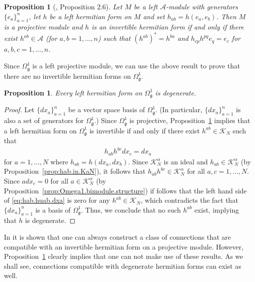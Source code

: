 \documentclass{amsart}
\newtheorem{proposition}[theorem]{Proposition}
\theoremstyle{definition}
\theoremstyle{remark}
\numberwithin{equation}{section}
\newcommand{\A}{\mathcal{A}}
\newcommand{\K}{\mathcal{K}}
\newcommand{\KN}{\K_N}
\newcommand{\KaN}{\K^\alpha_N}
\newcommand{\g}{\mathfrak{g}}
\newcommand{\Omegaoneg}{\Omega^1_{\g}}
\begin{document}
\begin{proposition}[\cite{a:levi-civita.class.nms}, Proposition 2.6]\label{prop:huab.equiv.projective}
  Let $M$ be a left $\A$-module with generators $\{e_a\}_{a=1}^n$, let
  $h$ be a left hermitian form on $M$ and set
  $h_{ab}=h(e_a,e_b)$. Then $M$ is a projective module and $h$ is an
  invertible hermitian form if and only if there exist $h^{ab}\in\A$
  (for $a,b=1,\ldots,n$) such that $(h^{ab})^\ast=h^{ba}$ and
  $h_{cp}h^{pq}e_q=e_c$  for $a,b,c=1,\ldots,n$.
\end{proposition}


\noindent
Since $\Omegaoneg$ is a left projective module, we can use the above
result to prove that there are no invertible hermitian forms on
$\Omegaoneg$.

\begin{proposition}\label{prop:no.invertible.forms}
  Every left hermitian form on $\Omegaoneg$ is degenerate.
\end{proposition}

\begin{proof}
  Let $\{dx_a\}_{a=1}^n$ be a vector space basis of $\Omegaoneg$. (In
  particular, $\{dx_a\}_{a=1}^n$ is also a set of generators for
  $\Omegaoneg$.) Since $\Omegaoneg$ is projective,
  Proposition~\ref{prop:huab.equiv.projective} implies that a left
  hermitian form on $\Omegaoneg$ is invertible if and only if there
  exist $h^{ab}\in\KN$ such that
  \begin{align}\label{eq:hab.huab.dxa}
    h_{ab}h^{bc}dx_c = dx_a
  \end{align}
  for $a=1,\ldots,N$ where $h_{ab}=h(dx_a,dx_b)$. Since $\KaN$ is an
  ideal and $h_{ab}\in\KaN$ (by Proposition~\ref{prop:hab.in.KaN}), it
  follows that $h_{ab}h^{bc}\in\KaN$ for all $a,c=1,\ldots,N$. Since
  $adx_c=0$ for all $a\in\KaN$ (by
  Proposition~\ref{prop:Omega1.bimodule.structure}) if follows that
  the left hand side of \eqref{eq:hab.huab.dxa} is zero for any
  $h^{ab}\in\KN$, which contradicts the fact that $\{dx_a\}_{a=1}^n$
  is a basis of $\Omegaoneg$. Thus, we conclude that no such $h^{ab}$
  exist, implying that $h$ is degenerate.
\end{proof}

\noindent
In \cite{a:levi-civita.class.nms} it is shown that one can always
construct a class of connections that are compatible with an
invertible hermitian form on a projective module. However,
Proposition~\ref{prop:no.invertible.forms} clearly implies that one
can not make use of these results. As we shall see, connections
compatible with degenerate hermitian forms can exist as well.
\end{document}

